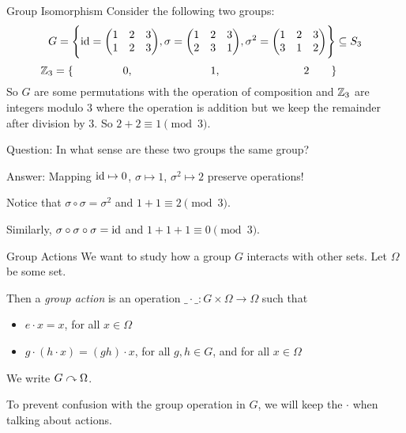 \documentclass[aspectratio=169]{beamer}
\begin{document}
\begin{frame}{Group Isomorphism}
    Consider the following two groups:
    \[
       G = \Bigg\{  { \operatorname{id} = \begin{pmatrix} 1 & 2 & 3 \\ 1 & 2 & 3 \end{pmatrix}}, \sigma =  {\begin{pmatrix} 1 & 2 & 3 \\ 2 & 3 & 1 \end{pmatrix}},  { \sigma^2 = \begin{pmatrix} 1 & 2 & 3 \\ 3 & 1 & 2 \end{pmatrix}}  \Bigg\}  \subseteq S_3
    \]
    \[
     \hspace{-30pt}  \Z_3 = \{ \hspace{45pt} 0, \hspace{70pt} 1, \hspace{75pt} 2 \hspace{20pt} \}  
    \]
    So $G$ are some permutations with the operation of composition and $\mathbb{Z}_3$ are integers modulo $3$ where the operation is addition but we keep the remainder after division by $3$. So $2 + 2 \equiv 1 \pmod{3}$.
    
    \textcolor{sigma@alertred}{Question:} In what sense are these two groups the same group? \pause

    \textcolor{sigma@mainblue}{Answer:} Mapping $\operatorname{id} \mapsto 0$, $\sigma \mapsto 1$, $\sigma^2 \mapsto 2$ preserve operations! \pause
    
    Notice that $\sigma \circ \sigma = \sigma^2$ and $1 + 1 \equiv 2 \pmod{3}$. \pause
    
    Similarly, $\sigma \circ \sigma \circ \sigma = \operatorname{id}$ and $1 + 1 + 1 \equiv 0 \pmod{3}$.
\end{frame}

\begin{frame}{Group Actions}
    We want to study how a group $G$ interacts with other sets. \pause
    Let $\Omega$ be some set.
    
    \begin{defn}
        Then a \emph{group action} is an operation $\_ \cdot \_ \colon G \times \Omega \to \Omega$ such that \pause
        \begin{itemize}
            \item $e\cdot x = x$, for all $x\in \Omega$ \pause
            \item $g\cdot(h\cdot x) = (gh)\cdot x$, for all $g,h\in G$, and for all $x\in \Omega$
        \end{itemize}
    We write $G \curvearrowright \Omega$.
    \end{defn}
    
    To prevent confusion with the group operation in $G$, we will keep the $\cdot$ when talking about actions.
\end{frame}
\end{document}
